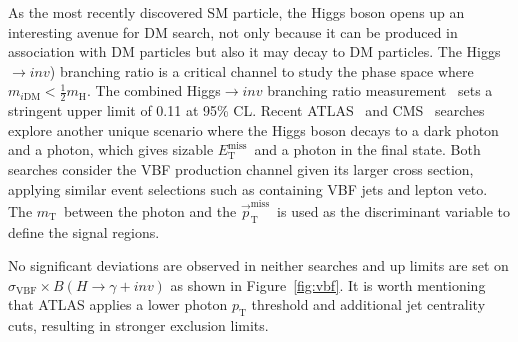 \documentclass{moriond}
\def\mt{m_{\textrm{T}}}
\def\et{E_\textrm{T}^{\textrm{miss}}}
\def\ptmiss{\vec{p}_\textrm{T}^{\textrm{miss}}}
\begin{document}
As the most recently discovered SM particle, the Higgs boson opens up an
interesting avenue for DM search, not only because it can be produced in
association with DM particles but also it may decay to DM particles. The
Higgs$\rightarrow inv$) branching ratio is a critical channel to study the
phase space where $m_{i\textrm{DM}} < \frac{1}{2}m_{\textrm{H}}$. The combined
Higgs$\rightarrow inv$ branching ratio measurement~\cite{hiv} sets a stringent
upper limit of 0.11 at 95\% CL. Recent ATLAS~\cite{atlasvbf} and
CMS~\cite{cmsvbf} searches explore another unique scenario where the Higgs boson
decays to a dark photon and a photon, which gives sizable $\et$\ and a photon
in the final state. Both searches consider the VBF production channel given its
larger cross section, applying similar event selections such as containing VBF
jets and lepton veto. The $\mt$\ between the photon and the $\ptmiss$\ is used
as the discriminant variable to define the signal regions. 

No significant deviations are observed in neither searches and up limits are set on $\sigma_{\textrm{VBF}}\times B(H\rightarrow\gamma+inv)$ as shown in Figure~\ref{fig:vbf}.
It is worth mentioning that ATLAS applies a lower photon $p_{\textrm{T}}$ threshold and
additional jet centrality cuts, resulting in stronger exclusion limits.  
\end{document}
